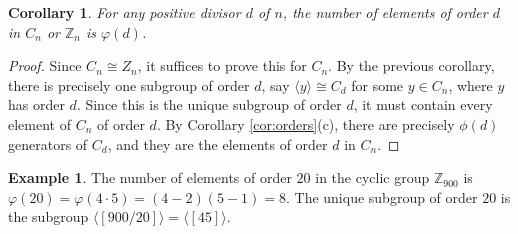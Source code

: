 \documentclass[11pt]{article}
\newtheorem{cor}[thm]{Corollary}
\theoremstyle{definition}
\newtheorem{example}[thm]{Example}
\newcommand{\Z}{\mathbb{Z}} %
\newcommand{\gen}[1]{\langle #1 \rangle}
\begin{document}
\begin{cor}
  For any positive divisor $d$ of $n$, the number of elements of order
  $d$ in $C_n$ or $\Z_n$ is $\varphi(d)$.
\end{cor}

\begin{proof}
  Since $C_n \cong Z_n$, it suffices to prove this for $C_n$. By the
  previous corollary, there is precisely one subgroup of order $d$,
  say $\gen{y} \cong C_d$ for some $y \in C_n$, where $y$ has order
  $d$. Since this is the unique subgroup of order $d$, it must contain
  every element of $C_n$ of order $d$.  By Corollary
  \ref{cor:orders}(c), there are precisely $\phi(d)$ generators of
  $C_d$, and they are the elements of order $d$ in $C_n$.
\end{proof}

\begin{example}
  The number of elements of order $20$ in the cyclic group $\Z_{900}$
  is $\varphi(20) = \varphi(4 \cdot 5) = (4-2)(5-1) = 8$. The unique
  subgroup of order $20$ is the subgroup
  $\gen{[900/20]} = \gen{[45]}$.
\end{example}
\end{document}
